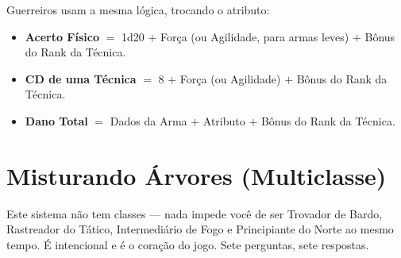 Guerreiros usam a mesma lógica, trocando o atributo:

\begin{itemize}
    \item \textbf{Acerto Físico} $=$ 1d20 $+$ Força (ou Agilidade, para armas leves) $+$
          Bônus do Rank da Técnica.
    \item \textbf{CD de uma Técnica} $=$ 8 $+$ Força (ou Agilidade) $+$ Bônus do Rank da
          Técnica.
    \item \textbf{Dano Total} $=$ Dados da Arma $+$ Atributo $+$ Bônus do Rank da Técnica.
\end{itemize}

\section{Misturando Árvores (Multiclasse)}

Este sistema não tem classes --- nada impede você de ser Trovador de Bardo, Rastreador do
Tático, Intermediário de Fogo e Principiante do Norte ao mesmo tempo. É intencional e é o
coração do jogo. Sete perguntas, sete respostas.


